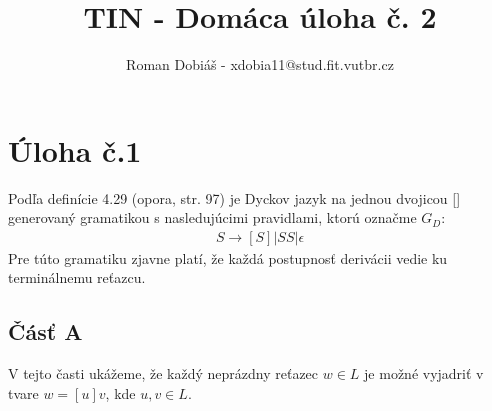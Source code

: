 \documentclass[10pt]{article}
\begin{document}
 
 
 
\title{TIN - Domáca úloha č. 2}%
\author{Roman Dobiáš - xdobia11@stud.fit.vutbr.cz}
 
\maketitle

\section*{Úloha č.1}
Podľa definície 4.29 (opora, str. 97) je Dyckov jazyk na jednou dvojicou [] generovaný 
gramatikou s nasledujúcimi pravidlami, ktorú označme $G_D$:
\begin{align}
    S \to [ S ] | SS | \epsilon
\end{align}
Pre túto gramatiku zjavne platí, že každá postupnosť derivácii vedie ku terminálnemu reťazcu.

\subsection*{Čásť A}
V tejto časti ukážeme, že každý neprázdny reťazec $w \in L$ je možné vyjadriť v tvare $w = [u]v$,
kde $u,v \in L$.
\end{document}
